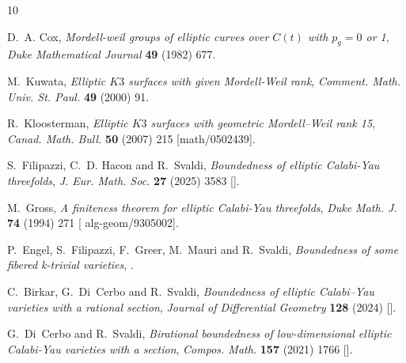 \documentclass[11pt]{amsart}
\theoremstyle{definition}
\theoremstyle{definition}
\theoremstyle{remark}
\theoremstyle{remark}
\theoremstyle{definition}
\theoremstyle{conjecture}
\begin{document}
\providecommand{\href}[2]{#2}\begingroup\raggedright\begin{thebibliography}{10}

D.~A. Cox, \emph{Mordell-weil groups of elliptic curves over {$C(t)$} with
  {$p_g=0$} or 1},
  \href{https://doi.org/10.1215/S0012-7094-82-04935-3}{\emph{Duke Mathematical
  Journal} {\bfseries 49} (1982) 677}.

M.~Kuwata, \emph{Elliptic {$K3$} surfaces with given {M}ordell-{W}eil rank},
  {\emph{Comment. Math. Univ. St. Paul.} {\bfseries 49} (2000) 91}.

R.~Kloosterman, \emph{Elliptic {$K3$} surfaces with geometric {M}ordell--{W}eil
  rank 15}, \href{https://doi.org/10.4153/CMB-2007-023-2}{\emph{Canad. Math.
  Bull.} {\bfseries 50} (2007) 215}
  [\href{https://arxiv.org/abs/math/0502439}{{\ttfamily math/0502439}}].

S.~Filipazzi, C.~D. Hacon and R.~Svaldi, \emph{{Boundedness of elliptic
  Calabi-Yau threefolds}}, \href{https://doi.org/10.4171/JEMS/1467}{\emph{J.
  Eur. Math. Soc.} {\bfseries 27} (2025) 3583}
  [\href{https://arxiv.org/abs/2112.01352}{{}}].

M.~Gross, \emph{A finiteness theorem for elliptic {C}alabi-{Y}au threefolds},
  \href{https://doi.org/10.1215/S0012-7094-94-07414-0}{\emph{Duke Math. J.}
  {\bfseries 74} (1994) 271}
  [\href{https://arxiv.org/abs/alg-geom/9305002}{{\ttfamily
  alg-geom/9305002}}].

P.~Engel, S.~Filipazzi, F.~Greer, M.~Mauri and R.~Svaldi, \emph{Boundedness of
  some fibered k-trivial varieties},
  \href{https://arxiv.org/abs/2507.00973}{{}}.

C.~Birkar, G.~Di~Cerbo and R.~Svaldi, \emph{Boundedness of elliptic
  {C}alabi{--}{Y}au varieties with a rational section},
  \href{https://doi.org/10.4310/jdg/1727712887}{\emph{Journal of Differential
  Geometry} {\bfseries 128} (2024) }
  [\href{https://arxiv.org/abs/2010.09769}{{}}].

G.~Di~Cerbo and R.~Svaldi, \emph{Birational boundedness of low-dimensional
  elliptic {C}alabi-{Y}au varieties with a section},
  \href{https://doi.org/10.1112/S0010437X2100717X}{\emph{Compos. Math.}
  {\bfseries 157} (2021) 1766}
  [\href{https://arxiv.org/abs/1608.02997}{{}}].


\end{thebibliography}
\end{document}
